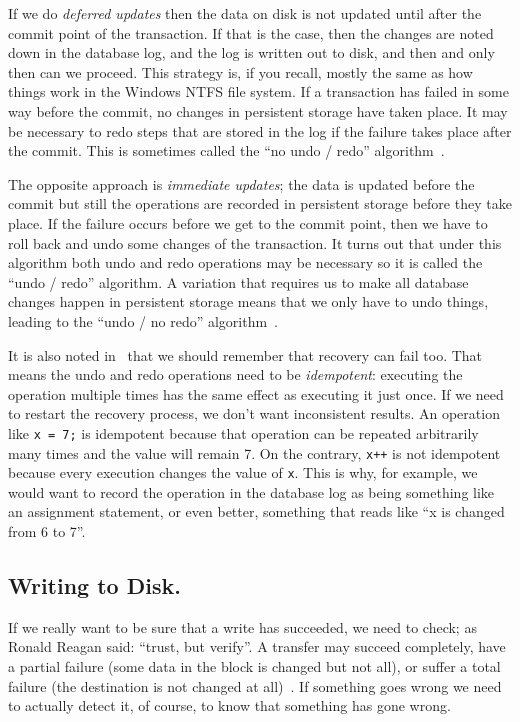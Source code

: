 \documentclass[a4paper]{report}
\begin{document}
If we do \textit{deferred updates} then the data on disk is not updated until after the commit point of the transaction. If that is the case, then the changes are noted down in the database log, and the log is written out to disk, and then and only then can we proceed. This strategy is, if you recall, mostly the same as how things work in the Windows NTFS file system. If a transaction has failed in some way before the commit, no changes in persistent storage have taken place. It may be necessary to redo steps that are stored in the log if the failure takes place after the commit. This is sometimes called the ``no undo / redo'' algorithm~\cite{fds}.

The opposite approach is \textit{immediate updates}; the data is updated before the commit but still the operations are recorded in persistent storage before they take place. If the failure occurs before we get to the commit point, then we have to roll back and undo some changes of the transaction. It turns out that under this algorithm both undo and redo operations may be necessary so it is called the ``undo / redo'' algorithm. A variation that requires us to make all database changes happen in persistent storage means that we only have to undo things, leading to the ``undo / no redo'' algorithm~\cite{fds}.

It is also noted in~\cite{fds} that we should remember that recovery can fail too. That means the undo and redo operations need to be \textit{idempotent}: executing the operation multiple times has the same effect as executing it just once. If we need to restart the recovery process, we don't want inconsistent results. An operation like \texttt{x = 7;} is idempotent because that operation can be repeated arbitrarily many times and the value will remain 7. On the contrary, \texttt{x++} is not idempotent because every execution changes the value of \texttt{x}. This is why, for example, we would want to record the operation in the database log as being something like an assignment statement, or even better, something that reads like ``x is changed from 6 to 7''.

\subsection*{Writing to Disk.}

If we really want to be sure that a write has succeeded, we need to check; as Ronald Reagan said: ``trust, but verify''. A transfer may succeed completely, have a partial failure (some data in the block is changed but not all), or suffer a total failure (the destination is not changed at all)~\cite{dsc}. If something goes wrong we need to actually detect it, of course, to know that something has gone wrong. 
\end{document}
